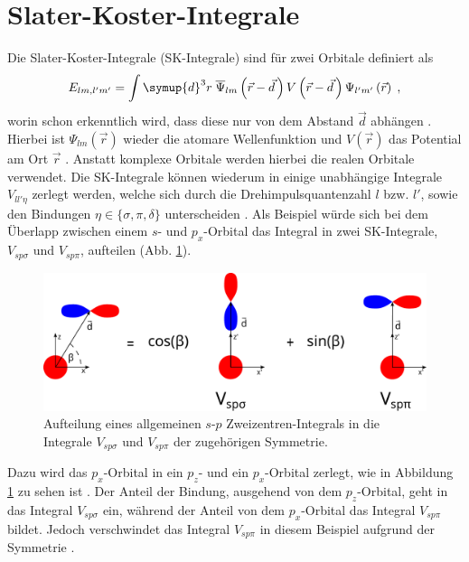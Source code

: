 \section{Slater-Koster-Integrale}
\label{sec:theo_SK}
Die Slater-Koster-Integrale (SK-Integrale) sind für zwei Orbitale definiert als
\begin{equation}
    E_{lm,l'm'} = \int \symup{d}^3r \; \overline{\Psi}_{lm} \left (\vec{r}-\vec{d} \, \right )
    V \left ( \vec{r} - \vec{d} \, \right ) \Psi_{l'm'} \left (\vec{r} \right ) \; , \label{eqn:SK}
\end{equation}
worin schon erkenntlich wird, dass diese nur von dem Abstand $\vec{d}$ abhängen \cite{SC_literature}.
Hierbei ist $\Psi_{lm}(\vec{r})$ wieder die atomare Wellenfunktion und $V(\vec{r})$ das Potential am Ort $\vec{r}$ \cite{SC_literature}.
Anstatt komplexe Orbitale werden hierbei die realen Orbitale verwendet.
Die SK-Integrale können wiederum in einige unabhängige Integrale $V_{ll'\eta}$ zerlegt werden, welche sich durch die Drehimpulsquantenzahl $l$ bzw. $l'$, 
sowie den Bindungen $\eta \in \{\sigma ,\pi, \delta \}$ unterscheiden \cite{electronic_structure}.
Als Beispiel würde sich bei dem Überlapp zwischen einem $s$- und $p_x$-Orbital das Integral in zwei 
SK-Integrale, $V_{sp\sigma}$ und $V_{sp\pi}$, aufteilen (Abb. \ref{fig:TC}).
\begin{figure}
    \centering
    \includegraphics[width = \textwidth]{Plots/SK.pdf}
    \caption{Aufteilung eines allgemeinen $s$-$p$ Zweizentren-Integrals in die Integrale $V_{sp\sigma}$ und $V_{sp\pi}$ der zugehörigen Symmetrie.}
    \label{fig:TC}
\end{figure}
Dazu wird das $p_x$-Orbital in ein $p_z$- und ein $p_x$-Orbital zerlegt, wie in Abbildung \ref{fig:TC} zu sehen ist \cite{SC_literature, electronic_structure}.
Der Anteil der Bindung, ausgehend von dem $p_z$-Orbital, geht in das Integral $V_{sp\sigma}$ ein, während 
der Anteil von dem $p_x$-Orbital das Integral $V_{sp\pi}$ bildet.
Jedoch verschwindet das Integral $V_{sp\pi}$ in diesem Beispiel aufgrund der Symmetrie \cite{SC_literature}.
